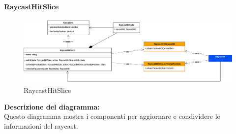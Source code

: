 \paragraph{RaycastHitSlice}
\begin{figure}[h!] \centering
    \includegraphics[scale=0.35]{template/images/uml_front/logic/raycastslice.png}
    \caption{RaycastHitSlice}
\end{figure}
\textbf{Descrizione del diagramma:}\\
Questo diagramma mostra i componenti per aggiornare e condividere le informazioni del raycast.
